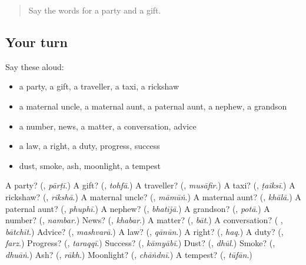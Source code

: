 \begin{quote}
Say the words for a party and a gift.
\end{quote}

\subsection*{Your turn}
Say these aloud:

\begin{itemize}
\raggedright
  \item a party, a gift, a traveller, a taxi, a rickshaw
  \item a maternal uncle, a maternal aunt, a paternal aunt, a nephew, a grandson
  \item a number, news, a matter, a conversation, advice
  \item a law, a right, a duty, progress, success
  \item dust, smoke, ash, moonlight, a tempest
\end{itemize}

\begin{tcolorbox}[breakable,colback=teal!4,colframe=teal!35!black,title={Before you move on}]
A party? (\textbf{}, \emph{pārṭī}.) A gift? (\textbf{}, \emph{tohfā}.) A traveller? (\textbf{}, \emph{musāfir}.) A taxi? (\textbf{}, \emph{ṭaiksī}.) A rickshaw? (\textbf{}, \emph{rikshā}.) A maternal uncle? (\textbf{}, \emph{māmūṅ}.) A maternal aunt? (\textbf{}, \emph{khālā}.) A paternal aunt? (\textbf{}, \emph{phuphī}.) A nephew? (\textbf{}, \emph{bhatījā}.) A grandson? (\textbf{}, \emph{potā}.) A number? (\textbf{}, \emph{nambar}.) News? (\textbf{}, \emph{khabar}.) A matter? (\textbf{}, \emph{bāt}.) A conversation? (\textbf{ }, \emph{bātchīt}.) Advice? (\textbf{}, \emph{mashvarā}.) A law? (\textbf{}, \emph{qānūn}.) A right? (\textbf{}, \emph{haq}.) A duty? (\textbf{}, \emph{farz}.) Progress? (\textbf{}, \emph{taraqqī}.) Success? (\textbf{}, \emph{kāmyābī}.) Dust? (\textbf{}, \emph{dhūl}.) Smoke? (\textbf{}, \emph{dhuāṅ}.) Ash? (\textbf{}, \emph{rākh}.) Moonlight? (\textbf{}, \emph{chāṅdnī}.) A tempest? (\textbf{}, \emph{tūfān}.)
\end{tcolorbox}
